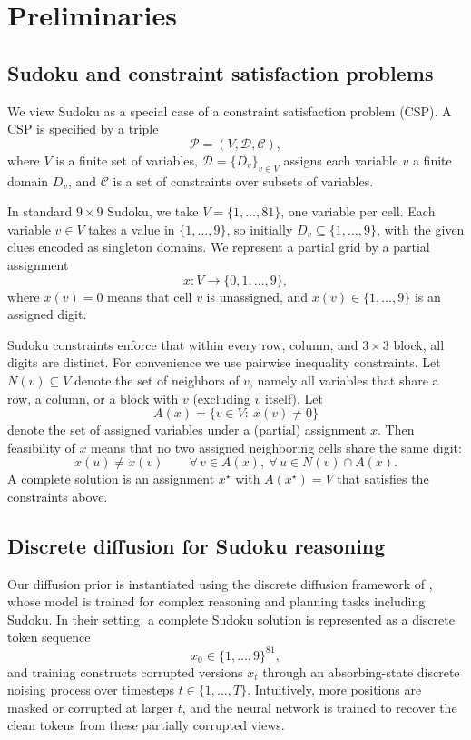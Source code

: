 \documentclass[lettersize,journal]{IEEEtran}
\begin{document}
\section{Preliminaries}
\label{sec:preliminaries}

\subsection{Sudoku and constraint satisfaction problems}
We view Sudoku as a special case of a constraint satisfaction problem (CSP). A CSP is specified by a triple
\[
\mathcal{P}=(V,\mathcal{D},\mathcal{C}),
\]
where $V$ is a finite set of variables, $\mathcal{D}=\{D_v\}_{v\in V}$ assigns each variable $v$ a finite domain $D_v$, and $\mathcal{C}$ is a set of constraints over subsets of variables.

In standard $9\times 9$ Sudoku, we take $V=\{1,\dots,81\}$, one variable per cell. Each variable $v\in V$ takes a value in $\{1,\dots,9\}$, so initially $D_v\subseteq\{1,\dots,9\}$, with the given clues encoded as singleton domains. We represent a partial grid by a partial assignment
\[
x:V\rightarrow \{0,1,\dots,9\},
\]
where $x(v)=0$ means that cell $v$ is unassigned, and $x(v)\in\{1,\dots,9\}$ is an assigned digit.

Sudoku constraints enforce that within every row, column, and $3\times 3$ block, all digits are distinct. For convenience we use pairwise inequality constraints. Let $N(v)\subseteq V$ denote the set of neighbors of $v$, namely all variables that share a row, a column, or a block with $v$ (excluding $v$ itself). Let
\[
A(x)=\{v\in V:\ x(v)\neq 0\}
\]
denote the set of assigned variables under a (partial) assignment $x$. Then feasibility of $x$ means that no two assigned neighboring cells share the same digit:
\[
x(u)\neq x(v)\qquad \forall\, v\in A(x),\ \forall\, u\in N(v)\cap A(x).
\]
A complete solution is an assignment $x^\star$ with $A(x^\star)=V$ that satisfies the constraints above.



\subsection{Discrete diffusion for Sudoku reasoning}

Our diffusion prior is instantiated using the discrete diffusion framework of \cite{ye2025beyond}, whose model is trained for complex reasoning and planning tasks including Sudoku. In their setting, a complete Sudoku solution is represented as a discrete token sequence
\[
x_0 \in \{1,\dots,9\}^{81},
\]
and training constructs corrupted versions \(x_t\) through an absorbing-state discrete noising process over timesteps \(t \in \{1,\dots,T\}\). Intuitively, more positions are masked or corrupted at larger \(t\), and the neural network is trained to recover the clean tokens from these partially corrupted views.
\end{document}

